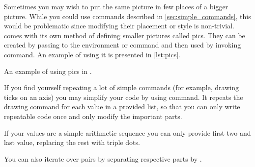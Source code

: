 Sometimes you may wish to put the same picture in few places of a bigger
picture. While you could use commands described in
\autoref{sec:simple_commands}, this would be problematic since modifying their
placement or style is non-trivial. \TikZ{} comes with its own method of
defining smaller pictures called pics. They can be created by passing
 to the \TikZ{} environment or command
and then used by invoking  command. An example of using it is
presented in \autoref{lst:pics}.
\begin{listing}
  \begin{example}[vertical_mode, examplewidth=0.9\linewidth]
\end{example}
  \caption{An example of using pics in \TikZ{}.}\label{lst:pics}
\end{listing}
If you find yourself repeating a lot of simple commands (for example, drawing
ticks on an axis) you may simplify your code by using  command. It
repeats the drawing command for each value in a provided list, so that you can
only write repeatable code once and only modify the important parts.
\begin{example}[vertical_mode, examplewidth=0.8\linewidth]
\end{example}
If your values are a simple arithmetic sequence you can only provide first two
and last value, replacing the rest with triple dots.
\begin{example}[vertical_mode, examplewidth=0.8\linewidth]
\end{example}
You can also iterate over pairs by separating respective parts by \ltx{/}.
\begin{example}
\end{example}

